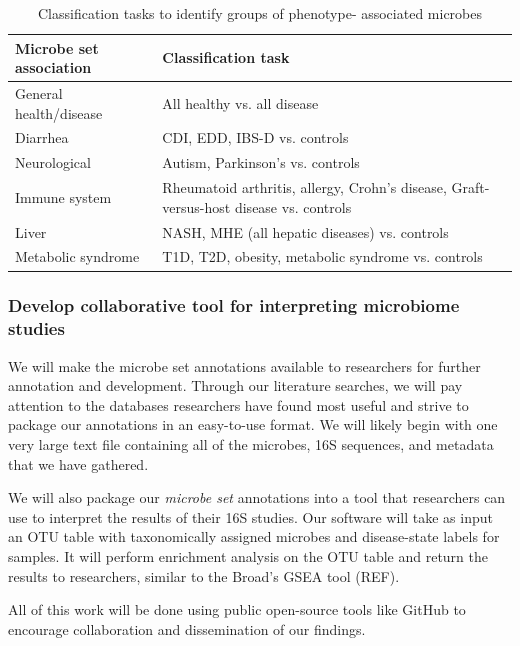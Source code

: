 \documentclass[12pt]{article}
\begin{document}
\begin{table}
\begin{center}
\begin{tabular}{|p{6cm}|p{10cm}|}
	\hline
	\textbf{Microbe set association} & \textbf{Classification task} \\
	\hline
	General health/disease & All healthy vs. all disease \\
	\hline
	Diarrhea & CDI, EDD, IBS-D vs. controls \\
	\hline
	Neurological & Autism, Parkinson's vs. controls \\
	\hline
	Immune system & Rheumatoid arthritis, allergy, Crohn's disease, 
	Graft-versus-host disease vs. controls \\
	\hline
	Liver & NASH, MHE (all hepatic diseases) vs. controls\\
	\hline
	Metabolic syndrome & T1D, T2D, obesity, metabolic syndrome vs. 
	controls \\
	\hline
\end{tabular}
\caption{Classification tasks to identify groups of phenotype-
associated microbes}\label{tab:classifications}
\end{center}
\end{table}

\subsubsection{Develop collaborative tool for interpreting microbiome studies}
We will make the microbe set annotations available to researchers for 
further annotation and development. Through our literature searches, 
we will pay attention to the databases researchers have found most 
useful and strive to package our annotations in an easy-to-use format. 
We will likely begin with one very large text file containing all of 
the microbes, 16S sequences, and metadata that we have gathered. 

We will also package our \textit{microbe set} annotations into a tool 
that researchers can use to interpret the results of their 16S 
studies. Our software will take as input an OTU table with 
taxonomically assigned microbes and disease-state labels for samples. 
It will perform enrichment analysis on the OTU table and return the 
results to researchers, similar to the Broad's GSEA tool (REF).

All of this work will be done using public open-source tools like 
GitHub to encourage collaboration and dissemination of our findings.
\end{document}
